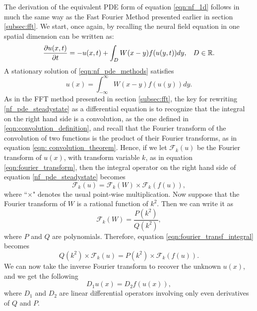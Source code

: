 \documentclass{uonmathreport}
\begin{document}
The derivation of the equivalent PDE form of equation \ref{eqn:nf_1d} follows in much the same way as the Fast Fourier Method presented earlier in section \ref{subsec:fft}. We start, once again, by recalling the neural field equation in one spatial dimension can be written as:
\begin{equation}\label{eqn:nf_pde_methods}
\frac{\partial u(x,t)}{\partial t} = -u(x,t) +
\int_{D} W(x-y)f(u(y,t))dy, \hspace{3mm} D \in \mathbb{R}.
\end{equation}
A stationary solution of \ref{eqn:nf_pde_methods} satisfies
\begin{equation}\label{nf_pde_steadystate}
u(x) = \int_{-\infty}^{\infty} W(x-y)f(u(y))dy.
\end{equation}
As in the FFT method presented in section \ref{subsec:fft}, the key for rewriting \ref{nf_pde_steadystate} as a  differential equation is to recognize that the integral on the right hand side is a convolution, as the one defined in \ref{eqn:convolution_definition}, and recall that the Fourier transform of the convolution of two functions is the product of their Fourier transforms, as in equation \ref{eqn: convolution_theorem}. Hence, if we let $\mathcal{F}_k(u)$ be the Fourier transform of $u(x)$, with transform variable $k$, as in equation \ref{eqn:fourier_transform}, then the integral operator on the right hand side of equation \ref{nf_pde_steadystate} becomes
\begin{equation}\label{eqn:fourier_transf_integral}
\mathcal{F}_k(u) = \mathcal{F}_k(W) \times \mathcal{F}_k(f(u)),
\end{equation}
where ``$\times$" denotes the usual point-wise multiplication. Now suppose that the Fourier transform of $W$ is a rational function of $k^2$. Then we can write it as
\begin{equation}
\mathcal{F}_k(W) = \frac{P(k^2)}{Q(k^2)},
\end{equation} 
where $P$ and $Q$ are polynomials. Therefore, equation \ref{eqn:fourier_transf_integral} becomes
\begin{equation}
Q(k^2) \times \mathcal{F}_k(u) = P(k^2) \times \mathcal{F}_k(f(u)).
\end{equation}
We can now take the inverse Fourier transform to recover the unknown $u(x)$, and we get the following
\begin{equation}\label{eqn:pde2}
D_1 u(x) = D_2 f(u(x)),
\end{equation}
where $D_1$ and $D_2$ are linear differential operators involving only even derivatives of $Q$ and $P$.
\end{document}
